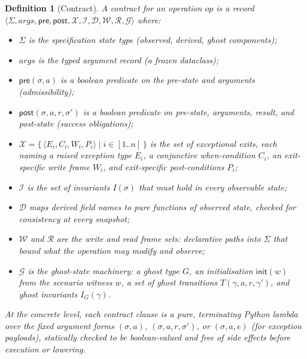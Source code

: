 \documentclass[11pt,a4paper]{article}
\newtheorem{definition}{Definition}
\begin{document}
\begin{definition}[Contract]
A contract for an operation $\mathit{op}$ is a record
$\langle \Sigma, \mathit{args}, \mathsf{pre}, \mathsf{post},
\mathcal{X}, \mathcal{I}, \mathcal{D}, \mathcal{W}, \mathcal{R},
\mathcal{G} \rangle$ where:

\begin{itemize}[nosep,leftmargin=*]
\item $\Sigma$ is the specification state type (observed, derived, ghost components);
\item $\mathit{args}$ is the typed argument record (a frozen dataclass);
\item $\mathsf{pre}(\sigma, a)$ is a boolean predicate on the pre-state and arguments (admissibility);
\item $\mathsf{post}(\sigma, a, r, \sigma')$ is a boolean predicate on pre-state, arguments, result, and post-state (success obligations);
\item $\mathcal{X} = \{\,\langle E_i, C_i, W_i, P_i\rangle \mid i \in [1..n] \,\}$ is the set of exceptional exits, each naming a raised exception type $E_i$, a conjunctive when-condition $C_i$, an exit-specific write frame $W_i$, and exit-specific post-conditions $P_i$;
\item $\mathcal{I}$ is the set of invariants $I(\sigma)$ that must hold in every observable state;
\item $\mathcal{D}$ maps derived field names to pure functions of observed state, checked for consistency at every snapshot;
\item $\mathcal{W}$ and $\mathcal{R}$ are the write and read frame sets: declarative paths into $\Sigma$ that bound what the operation may modify and observe;
\item $\mathcal{G}$ is the ghost-state machinery: a ghost type $G$, an initialisation $\mathsf{init}(w)$ from the scenario witness $w$, a set of ghost transitions $T(\gamma, a, r, \gamma')$, and ghost invariants $I_G(\gamma)$.
\end{itemize}

At the concrete level, each contract clause is a pure, terminating
Python lambda over the fixed argument forms $(\sigma, a)$,
$(\sigma, a, r, \sigma')$, or $(\sigma, a, e)$ (for exception
payloads), statically checked to be boolean-valued and free of side
effects before execution or lowering.\end{definition}
\end{document}
